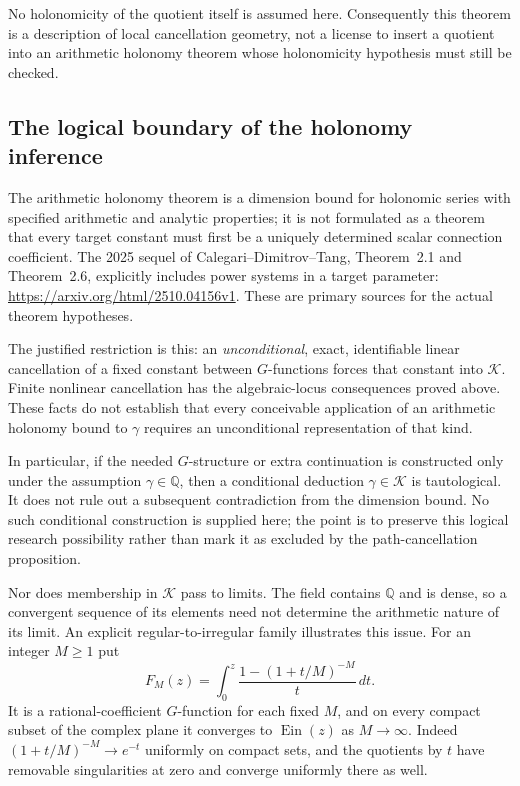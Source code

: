 \documentclass[11pt,a4paper]{article}
\theoremstyle{definition}
\theoremstyle{remark}
\numberwithin{equation}{section}
\begin{document}
No holonomicity of the quotient itself is assumed here.
Consequently this theorem is a description of local cancellation
geometry, not a license to insert a quotient into an arithmetic
holonomy theorem whose holonomicity hypothesis must still be checked.

\subsection{The logical boundary of the holonomy inference}

The arithmetic holonomy theorem is a dimension bound for holonomic
series with specified arithmetic and analytic properties; it is
not formulated as a theorem that every target constant must first
be a uniquely determined scalar connection coefficient.
The 2025 sequel of Calegari--Dimitrov--Tang, Theorem~2.1 and
Theorem~2.6, explicitly includes power systems in a target parameter:
\url{https://arxiv.org/html/2510.04156v1}.
These are primary sources for the actual theorem hypotheses.

The justified restriction is this: an \emph{unconditional}, exact,
identifiable linear cancellation of a fixed constant between
$G$-functions forces that constant into $\mathcal K$.
Finite nonlinear cancellation has the algebraic-locus consequences
proved above.  These facts do not establish that every conceivable
application of an arithmetic holonomy bound to $\gamma$ requires
an unconditional representation of that kind.

In particular, if the needed $G$-structure or extra continuation
is constructed only under the assumption $\gamma\in\mathbb Q$,
then a conditional deduction $\gamma\in\mathcal K$ is tautological.
It does not rule out a subsequent contradiction from the dimension
bound.  No such conditional construction is supplied here; the point
is to preserve this logical research possibility rather than mark
it as excluded by the path-cancellation proposition.

Nor does membership in $\mathcal K$ pass to limits.  The field
contains $\mathbb Q$ and is dense, so a convergent sequence of its
elements need not determine the arithmetic nature of its limit.
An explicit regular-to-irregular family illustrates this issue.
For an integer $M\geq1$ put
\begin{equation}\label{p6:hol:confluence-family}
 F_M(z)=\int_0^z\frac{1-(1+t/M)^{-M}}{t}\,dt.
\end{equation}
It is a rational-coefficient $G$-function for each fixed $M$, and
on every compact subset of the complex plane it converges to
$\operatorname{Ein}(z)$ as $M\to\infty$.
Indeed $(1+t/M)^{-M}\to e^{-t}$ uniformly on compact sets,
and the quotients by $t$ have removable singularities at zero
and converge uniformly there as well.
\end{document}
